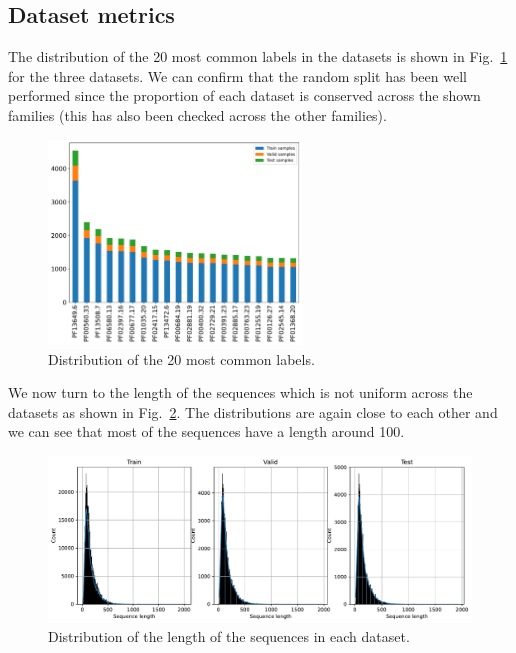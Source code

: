 \documentclass[12pt]{article}
\begin{document}
\subsection{Dataset metrics}

The distribution of the 20 most common labels in the datasets is shown in Fig.~\ref{fig:labels_dist} for the three datasets. We can confirm that the random split has been well performed since the proportion of each dataset is conserved across the shown families (this has also been checked across the other families).

\begin{figure}[htbp]
    \centering
    \includegraphics[width=0.6\textwidth]{figures/labels_dist.pdf}
    \caption{Distribution of the 20 most common labels.}
    \label{fig:labels_dist}
\end{figure}

We now turn to the length of the sequences which is not uniform across the datasets as shown in Fig.~\ref{fig:length_dist}. The distributions are again close to each other and we can see that most of the sequences have a length around 100.

\begin{figure}[htbp]
    \centering
    \includegraphics[width=\textwidth]{figures/length_seq.pdf}
    \caption{Distribution of the length of the sequences in each dataset.}
    \label{fig:length_dist}
\end{figure}
\end{document}
